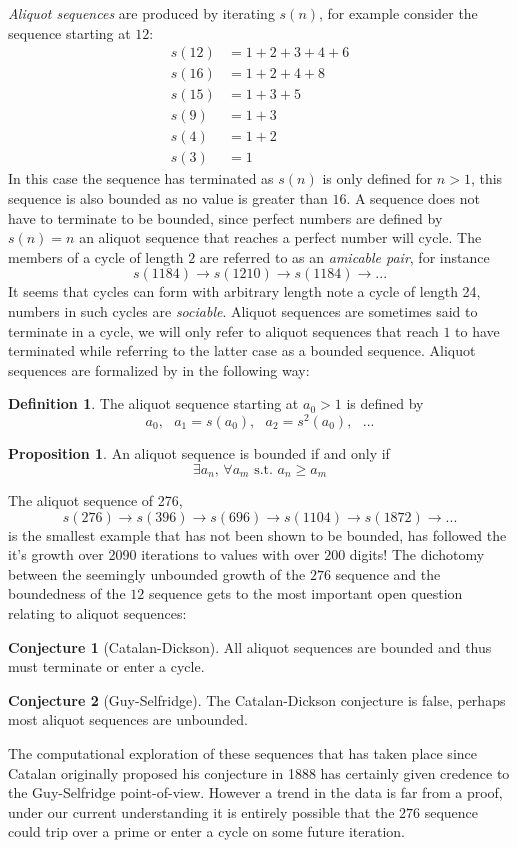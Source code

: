 \documentclass{article}
\theoremstyle{definition}
\newtheorem{definition}{Definition}[section]
\newtheorem{conjecture}{Conjecture}[section]
\newtheorem{proposition}{Proposition}[section]
\begin{document}
\textit{Aliquot sequences} are produced by iterating $s(n)$, for example consider the sequence starting at $12$:
\begin{align*}
    s(12) &= 1 + 2 + 3 + 4 + 6\\  
    s(16) &= 1 + 2 + 4 + 8\\
    s(15) &= 1 + 3 + 5\\
    s(9) &= 1 + 3\\
    s(4) &= 1 + 2\\
    s(3) &= 1
\end{align*}
In this case the sequence has terminated as $s(n)$ is only defined for $n > 1$, this sequence is also bounded as no value is greater than $16$. A sequence does not have to terminate to be bounded, since perfect numbers are defined by $s(n) = n$ an aliquot sequence that reaches a perfect number will cycle. The members of a cycle of length $2$ are referred to as an \textit{amicable pair}, for instance
$$s(1184) \to s(1210) \to s(1184) \to ...$$
It seems that cycles can form with arbitrary length \cite{chum_guy_jacobson_mosunov_2018} note a cycle of length 24, numbers in such cycles are \textit{sociable}. Aliquot sequences are sometimes said to terminate in a cycle, we will only refer to aliquot sequences that reach $1$ to have terminated while referring to the latter case as a bounded sequence. Aliquot sequences are formalized by \cite{bosma_kane_2010} in the following way:
%
\begin{definition}
The aliquot sequence starting at $a_0 > 1$ is defined by
$$a_0,\text{ }a_1 = s(a_0),\text{ }a_2 = s^2(a_0),\text{ }...$$
\end{definition}
%
\begin{proposition}An aliquot sequence is bounded if and only if 
$$\exists a_n,\,\forall a_m \text{ s.t. }a_n \geq a_m$$  
\end{proposition}
%
The aliquot sequence of 276, 
$$s(276) \rightarrow s(396) \rightarrow s(696) \rightarrow s(1104) \rightarrow s(1872)  \rightarrow ...$$
is the smallest example that has not been shown to be bounded, \cite{zimmermann_2016} has followed the it's growth over 2090 iterations to values with over $200$ digits! The dichotomy between the seemingly unbounded growth of the $276$ sequence and the boundedness of the $12$ sequence gets to the most important open question relating to aliquot sequences:
%
\begin{conjecture}[Catalan-Dickson]
All aliquot sequences are bounded and thus must terminate or enter a cycle. \cite{catalan_1888}
\end{conjecture}
%
\begin{conjecture}[Guy-Selfridge]
The Catalan-Dickson conjecture is false, perhaps most aliquot sequences are unbounded. \cite{guy_selfridge_1975} 
\end{conjecture}
%
The computational exploration of these sequences that has taken place since Catalan originally proposed his conjecture in 1888 has certainly given credence to the Guy-Selfridge point-of-view. However a trend in the data is far from a proof, under our current understanding it is entirely possible that the $276$ sequence could trip over a prime or enter a cycle on some future iteration.
%
\end{document}

